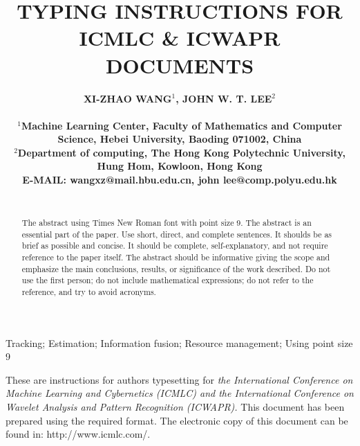 \documentclass[a4paper, times, 10pt,twocolumn]{article}
\begin{document}
\title{TYPING INSTRUCTIONS FOR ICMLC \& ICWAPR DOCUMENTS}  %

\author{\bf{\normalsize{XI-ZHAO WANG${^1}$, JOHN W. T. LEE${^2}$}}\\ %
\\
\normalsize{$^1$Machine Learning Center, Faculty of Mathematics and Computer Science, Hebei University, Baoding 071002, China}\\
\normalsize{$^2$Department of computing, The Hong Kong Polytechnic University, Hung Hom, Kowloon, Hong Kong} \\
\normalsize{E-MAIL: wangxz@mail.hbu.edu.cn, john lee@comp.polyu.edu.hk }\\
\\}


\maketitle \thispagestyle{empty}

\begin{abstract}
   {The abstract using Times New Roman font with point size 9. The abstract is an essential part of the paper. Use short, direct, and complete sentences. It shoulds be as brief as possible and concise. It should be complete, self-explanatory, and not require reference to the paper itself. The abstract should be informative giving the scope and emphasize the main conclusions, results, or significance of the work described. Do not use the first person; do not include mathematical expressions; do not refer to the reference, and try to avoid acronyms.}
\end{abstract}
\begin{keywords}
   {Tracking; Estimation; Information fusion; Resource
    management; Using point size 9}
\end{keywords}


These are instructions for authors typesetting for {\it the International Conference on Machine Learning and Cybernetics (ICMLC) and the International Conference on Wavelet Analysis and Pattern Recognition (ICWAPR).} This document has been prepared using the required format. The electronic copy of this document can be found in: http://www.icmlc.com/.
\end{document}
